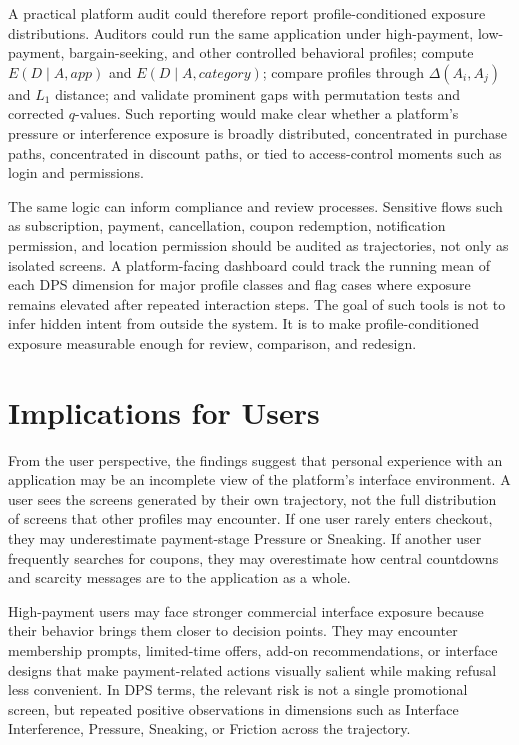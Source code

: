 A practical platform audit could therefore report profile-conditioned exposure distributions. Auditors could run the same application under high-payment, low-payment, bargain-seeking, and other controlled behavioral profiles; compute \(E(D \mid A, app)\) and \(E(D \mid A, category)\); compare profiles through \(\Delta(A_i,A_j)\) and \(L_1\) distance; and validate prominent gaps with permutation tests and corrected \(q\)-values. Such reporting would make clear whether a platform's pressure or interference exposure is broadly distributed, concentrated in purchase paths, concentrated in discount paths, or tied to access-control moments such as login and permissions.

The same logic can inform compliance and review processes. Sensitive flows such as subscription, payment, cancellation, coupon redemption, notification permission, and location permission should be audited as trajectories, not only as isolated screens. A platform-facing dashboard could track the running mean of each DPS dimension for major profile classes and flag cases where exposure remains elevated after repeated interaction steps. The goal of such tools is not to infer hidden intent from outside the system. It is to make profile-conditioned exposure measurable enough for review, comparison, and redesign.

\section{Implications for Users}

From the user perspective, the findings suggest that personal experience with an application may be an incomplete view of the platform's interface environment. A user sees the screens generated by their own trajectory, not the full distribution of screens that other profiles may encounter. If one user rarely enters checkout, they may underestimate payment-stage Pressure or Sneaking. If another user frequently searches for coupons, they may overestimate how central countdowns and scarcity messages are to the application as a whole.

High-payment users may face stronger commercial interface exposure because their behavior brings them closer to decision points. They may encounter membership prompts, limited-time offers, add-on recommendations, or interface designs that make payment-related actions visually salient while making refusal less convenient. In DPS terms, the relevant risk is not a single promotional screen, but repeated positive observations in dimensions such as Interface Interference, Pressure, Sneaking, or Friction across the trajectory.

